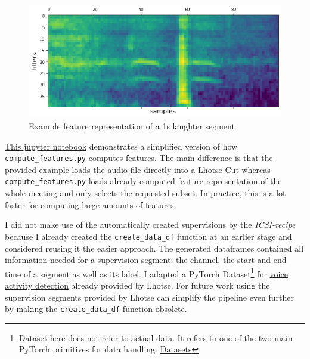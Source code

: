 \documentclass[bsc,frontabs,parskip,deptreport]{infthesis}
\begin{document}
\begin{figure}[h!]
    \centering
    \includegraphics[width=14cm]{imgs/sample_fbank_feat.png}
    \caption{Example feature representation of a 1s laughter segment}
    \label{fig:feature-sample}
\end{figure}

\href{https://github.com/LasseWolter/laughter-detection-icsi/blob/main/Demo.ipynb}{This jupyter notebook} demonstrates a simplified version of how \verb|compute_features.py| computes features. 
The main difference is that the provided example loads the audio file directly into a Lhotse Cut whereas \verb|compute_features.py| loads already computed feature representation of the whole meeting and only selects the requested subset. In practice, this is a lot faster for computing large amounts of features.

I did not make use of the automatically created supervisions by the \textit{ICSI-recipe} because I already created the \verb|create_data_df| function at an earlier stage and considered reusing it the easier approach.
The generated dataframes contained all information needed for a supervision segment: the channel, the start and end time of a segment as well as its label. 
I adapted a PyTorch Dataset\footnote{Dataset here does not refer to actual data. It refers to one of the two main PyTorch primitives for data handling: \href{https://PyTorch.org/tutorials/beginner/basics/data_tutorial.html}{Datasets}} for \href{https://lhotse.readthedocs.io/en/latest/datasets.html#lhotse.dataset.vad.VadDataset}{voice activity detection} already provided by Lhotse.
For future work using the supervision segments provided by Lhotse can simplify the pipeline even further by making the \verb|create_data_df| function obsolete. 
\end{document}
